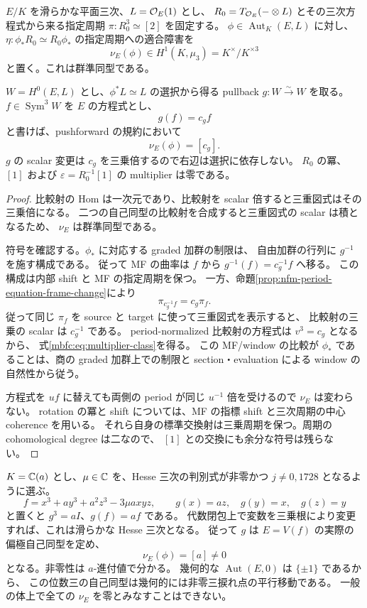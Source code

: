\begin{proposition}
\label{mbfc:prop:multiplier}
$E/K$ を滑らかな平面三次、$L=\mathcal O_E(1)$ とし、
$R_0=T_{\mathcal O_E}(-\otimes L)$ とその三次方程式から来る指定周期
$\pi:R_0^3\simeq[2]$ を固定する。
$\phi\in\operatorname{Aut}_K(E,L)$ に対し、
$\eta:\phi_*R_0\simeq R_0\phi_*$ の指定周期への適合障害を
\[
 \nu_E(\phi)\in H^1(K,\mu_3)=K^\times/K^{\times3}
\]
と置く。これは群準同型である。

$W=H^0(E,L)$ とし、$\phi^*L\simeq L$ の選択から得る
pullback $g:W\xrightarrow{\sim}W$ を取る。
$f\in\operatorname{Sym}^3W$ を $E$ の方程式とし、
\begin{equation}\label{mbfc:eq:multiplier}
 g(f)=c_g f
\end{equation}
と書けば、pushforward の規約において
\begin{equation}\label{mbfc:eq:multiplier-class}
 \nu_E(\phi)=[c_g].
\end{equation}
$g$ の scalar 変更は $c_g$ を三乗倍するので右辺は選択に依存しない。
$R_0$ の冪、$[1]$ および $\varepsilon=R_0^{-1}[1]$ の multiplier は零である。
\end{proposition}
\begin{proof}
比較射の Hom は一次元であり、比較射を scalar 倍すると三重図式はその三乗倍になる。
二つの自己同型の比較射を合成すると三重図式の scalar は積となるため、
$\nu_E$ は群準同型である。

符号を確認する。$\phi_*$ に対応する graded 加群の制限は、
自由加群の行列に $g^{-1}$ を施す構成である。
従って MF の曲率は $f$ から $g^{-1}(f)=c_g^{-1}f$ へ移る。
この構成は内部 shift と MF の指定周期を保つ。
一方、命題\ref{prop:nfm-period-equation-frame-change}により
\[
 \pi_{c_g^{-1}f}=c_g\pi_f.
\]
従って同じ $\pi_f$ を source と target に使って三重図式を表示すると、
比較射の三乗の scalar は $c_g^{-1}$ である。
period-normalized 比較射の方程式は $v^3=c_g$ となるから、
式\eqref{mbfc:eq:multiplier-class}を得る。
この MF/window の比較が $\phi_*$ であることは、商の graded 加群上での制限と
section・evaluation による window の自然性から従う。

方程式を $u f$ に替えても両側の period が同じ $u^{-1}$ 倍を受けるので
$\nu_E$ は変わらない。
rotation の冪と shift については、MF の指標 shift と三次周期の中心 coherence を用いる。
それら自身の標準交換射は三乗周期を保つ。周期の cohomological degree は二なので、
$[1]$ との交換にも余分な符号は残らない。
\end{proof}

\begin{example}
\label{mbfc:ex:nonzero-multiplier}
$K=\mathbb C(a)$ とし、$\mu\in\mathbb C$ を、Hesse 三次の判別式が非零かつ
$j\ne0,1728$ となるように選ぶ。
\[
 f=x^3+a y^3+a^2z^3-3\mu a xyz,
 \qquad g(x)=az,\quad g(y)=x,\quad g(z)=y
\]
と置くと $g^3=aI$、$g(f)=a f$ である。
代数閉包上で変数を三乗根により変更すれば、これは滑らかな Hesse 三次となる。
従って $g$ は $E=V(f)$ の実際の偏極自己同型を定め、
\[
 \nu_E(\phi)=[a]\ne0
\]
となる。非零性は $a$-進付値で分かる。
幾何的な $\operatorname{Aut}(E,0)$ は $\{\pm1\}$ であるから、
この位数三の自己同型は幾何的には非零三捩れ点の平行移動である。
一般の体上で全ての $\nu_E$ を零とみなすことはできない。
\end{example}

